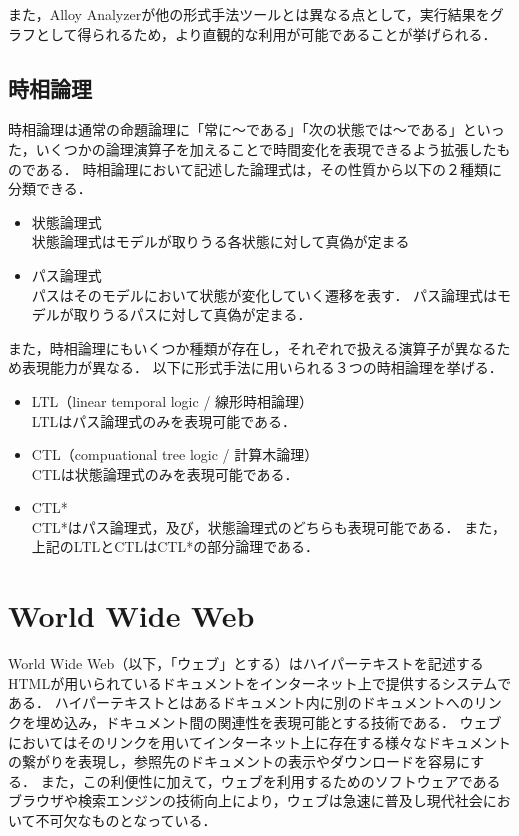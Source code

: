 \documentclass[12pt,a4paper]{jbook}
\begin{document}
また，Alloy Analyzerが他の形式手法ツールとは異なる点として，実行結果をグラフとして得られるため，より直観的な利用が可能であることが挙げられる．

\subsection{時相論理}
\label{sec:TemporalLogic}
時相論理は通常の命題論理に「常に～である」「次の状態では～である」といった，いくつかの論理演算子を加えることで時間変化を表現できるよう拡張したものである．
時相論理において記述した論理式は，その性質から以下の２種類に分類できる．
\begin{itemize}
\item 状態論理式\\
状態論理式はモデルが取りうる各状態に対して真偽が定まる
\item パス論理式\\
パスはそのモデルにおいて状態が変化していく遷移を表す．
パス論理式はモデルが取りうるパスに対して真偽が定まる．
\end{itemize}

また，時相論理にもいくつか種類が存在し，それぞれで扱える演算子が異なるため表現能力が異なる．
以下に形式手法に用いられる３つの時相論理を挙げる．
\begin{itemize}
\item LTL（linear temporal logic / 線形時相論理）\\
LTLはパス論理式のみを表現可能である．
\item CTL（compuational tree logic / 計算木論理）\\
CTLは状態論理式のみを表現可能である．
\item CTL*\\
CTL*はパス論理式，及び，状態論理式のどちらも表現可能である．
また，上記のLTLとCTLはCTL*の部分論理である．
\end{itemize}

\section{World Wide Web}
World Wide Web（以下，「ウェブ」とする）はハイパーテキストを記述するHTMLが用いられているドキュメントをインターネット上で提供するシステムである．
ハイパーテキストとはあるドキュメント内に別のドキュメントへのリンクを埋め込み，ドキュメント間の関連性を表現可能とする技術である．
ウェブにおいてはそのリンクを用いてインターネット上に存在する様々なドキュメントの繋がりを表現し，参照先のドキュメントの表示やダウンロードを容易にする．
また，この利便性に加えて，ウェブを利用するためのソフトウェアであるブラウザや検索エンジンの技術向上により，ウェブは急速に普及し現代社会において不可欠なものとなっている．
\end{document}
